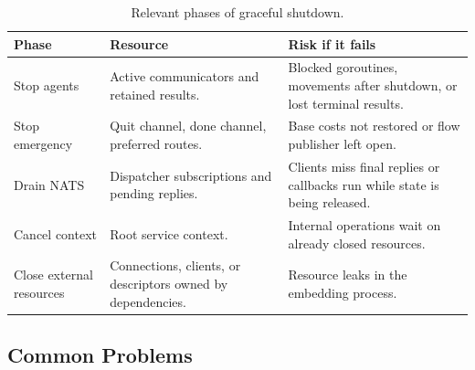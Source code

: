 \documentclass[12pt,a4paper]{report}
\begin{document}
\begin{table}[H]
\centering
\begin{tabular}{|p{}|p{}|p{}|}
\hline
\textbf{Phase} & \textbf{Resource} & \textbf{Risk if it fails} \\
\hline
Stop agents &
Active communicators and retained results. &
Blocked goroutines, movements after shutdown, or lost terminal results. \\
\hline
Stop emergency &
Quit channel, done channel, preferred routes. &
Base costs not restored or flow publisher left open. \\
\hline
Drain NATS &
Dispatcher subscriptions and pending replies. &
Clients miss final replies or callbacks run while state is being released. \\
\hline
Cancel context &
Root service context. &
Internal operations wait on already closed resources. \\
\hline
Close external resources &
Connections, clients, or descriptors owned by dependencies. &
Resource leaks in the embedding process. \\
\hline
\end{tabular}
\caption{Relevant phases of graceful shutdown.}
\end{table}

\subsection{Common Problems}
\end{document}
